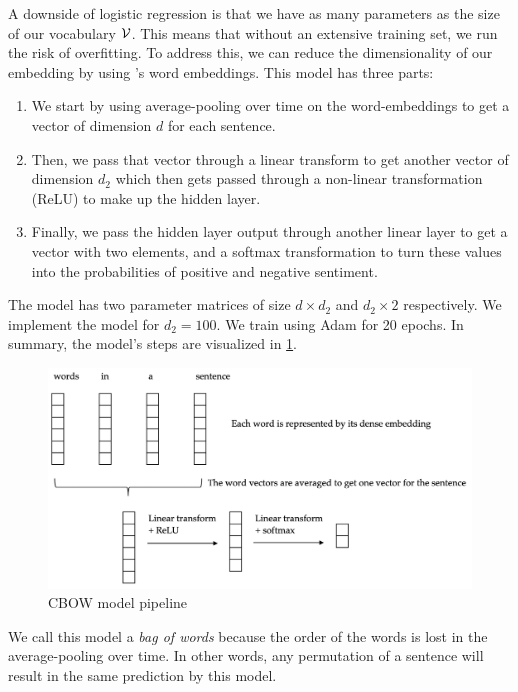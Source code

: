 \documentclass[11pt]{article}
\begin{document}
A downside of logistic regression is that we have as many parameters as the size
of our vocabulary $\mathcal{V}$. This means that without an extensive training set, we
run the risk of overfitting. To address this, we can reduce the dimensionality
of our embedding by using \citet{mikolov2013efficient}'s word embeddings. This model has three parts:

\begin{enumerate}
\item We start by using average-pooling over time on the word-embeddings to get
a vector of dimension $d$ for each sentence.
\item Then, we pass that vector through a linear transform to get another vector
of dimension $d_2$ which then gets passed through a non-linear transformation
(ReLU) to make up the hidden layer.
\item Finally, we pass the hidden layer output through another linear layer to
get a vector with two elements, and a softmax transformation to turn these
values into the probabilities of positive and negative sentiment.
\end{enumerate}

The model has two parameter matrices of size $d \times d_2$ and $d_2 \times 2$
respectively. We implement the model for $d_2=100$. We train using Adam for 20
epochs. In summary, the model's steps are visualized in \cref{fig:cbow}.

\begin{figure}[htb]
\centering
\includegraphics[width=\textwidth]{figs/cbow}
\caption{CBOW model pipeline}
\label{fig:cbow}
\end{figure}

We call this model a \emph{bag of words} because the order of the words is lost
in the average-pooling over time. In other words, any permutation of a sentence
will result in the same prediction by this model. 
\end{document}
